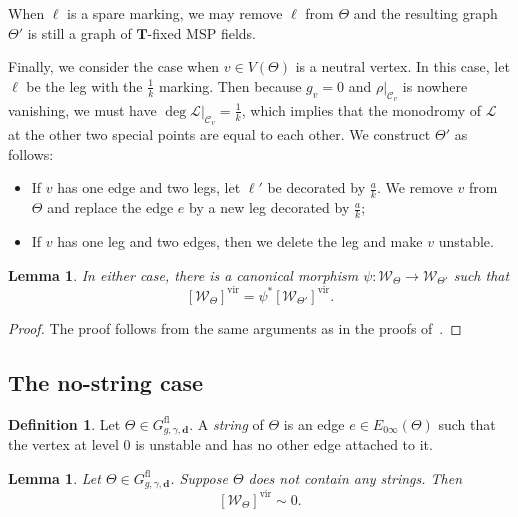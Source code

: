 \documentclass{amsart}
\newtheorem{lem}[thm]{Lemma}
\theoremstyle{definition}
\newtheorem{defn}[thm]{Definition}
\theoremstyle{remark}
\theoremstyle{plain}
\theoremstyle{definition}
\theoremstyle{remark}
\newcommand{\T}{\mathbf{T}}
\newcommand{\bd}{\mathbf{d}}
\newcommand{\mc}[1]{\mathcal{#1}}
\newcommand{\mr}[1]{\mathrm{#1}}
\newcommand{\1}{\mathbf{1}}
\newcommand{\2}{\mathbf{2}}
\newcommand{\3}{\mathbf{3}}
\newcommand{\vir}{\mr{vir}}
\begin{document}
When $\ell$ is a spare marking, we may remove $\ell$ from $\Theta$ and the resulting graph $\Theta'$ is still a graph of $\T$-fixed MSP fields.


Finally, we consider the case when $v \in V(\Theta)$ is a neutral vertex. In this case, let $\ell$ be the leg with the $\frac{1}{k}$ marking. Then because $g_v = 0$ and $\rho|_{\mc{C}_v}$ is nowhere vanishing, we must have $\deg \mc{L}|_{\mc{C}_v} = \frac{1}{k}$, which implies that the monodromy of $\mc{L}$ at the other two special points are equal to each other. We construct $\Theta'$ as follows:
\begin{itemize}
    \item If $v$ has one edge and two legs, let $\ell'$ be decorated by $\frac{a}{k}$. We remove $v$ from $\Theta$ and replace the edge $e$ by a new leg decorated by $\frac{a}{k}$;
    \item If $v$ has one leg and two edges, then we delete the leg and make $v$ unstable.
\end{itemize}
\begin{lem}
    In either case, there is a canonical morphism $\psi \colon \mc{W}_{\Theta} \to \mc{W}_{\Theta'}$ such that
    \[ [\mc{W}_{\Theta}]^{\vir} =  \psi^* [\mc{W}_{\Theta'}]^{\vir}. \]
\end{lem}

\begin{proof}
    The proof follows from the same arguments as in the proofs of~\cite[Lemmas 5.7--5.10]{nmsp}.
\end{proof}


\subsection{The no-string case}
\label{subsec:no string}

\begin{defn}
    Let $\Theta \in G_{g,\gamma,\bd}^{\mr{fl}}$. A \textit{string} of $\Theta$ is an edge $e \in E_{0\infty}(\Theta)$ such that the vertex at level $0$ is unstable and has no other edge attached to it.
\end{defn}

\begin{lem}
    Let $\Theta \in G_{g,\gamma,\bd}^{\mr{fl}}$. Suppose $\Theta$ does not contain any strings. Then
    \[ [\mc{W}_{\Theta}]^{\vir} \sim 0. \]
\end{lem}
\end{document}
